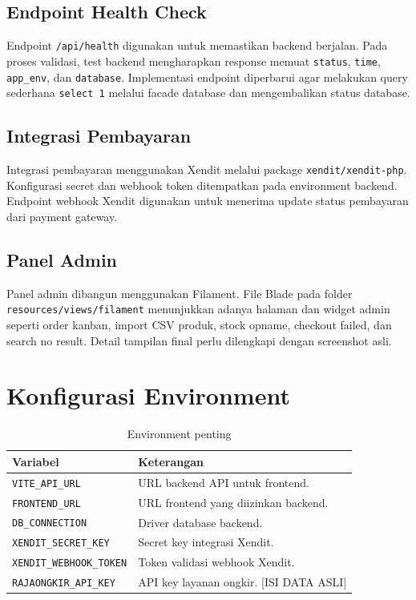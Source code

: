 \documentclass[12pt,a4paper]{report}
\begin{document}
\subsection{Endpoint Health Check}
Endpoint \texttt{/api/health} digunakan untuk memastikan backend berjalan. Pada proses validasi, test backend mengharapkan response memuat \texttt{status}, \texttt{time}, \texttt{app\_env}, dan \texttt{database}. Implementasi endpoint diperbarui agar melakukan query sederhana \texttt{select 1} melalui facade database dan mengembalikan status database.

\subsection{Integrasi Pembayaran}
Integrasi pembayaran menggunakan Xendit melalui package \texttt{xendit/xendit-php}. Konfigurasi secret dan webhook token ditempatkan pada environment backend. Endpoint webhook Xendit digunakan untuk menerima update status pembayaran dari payment gateway.

\subsection{Panel Admin}
Panel admin dibangun menggunakan Filament. File Blade pada folder \texttt{resources/views/filament} menunjukkan adanya halaman dan widget admin seperti order kanban, import CSV produk, stock opname, checkout failed, dan search no result. Detail tampilan final perlu dilengkapi dengan screenshot asli.

\section{Konfigurasi Environment}
\begin{table}[H]
\centering
\caption{Environment penting}
\begin{tabular}{p{}p{}}
\toprule
Variabel & Keterangan \\
\midrule
\texttt{VITE\_API\_URL} & URL backend API untuk frontend. \\
\texttt{FRONTEND\_URL} & URL frontend yang diizinkan backend. \\
\texttt{DB\_CONNECTION} & Driver database backend. \\
\texttt{XENDIT\_SECRET\_KEY} & Secret key integrasi Xendit. \\
\texttt{XENDIT\_WEBHOOK\_TOKEN} & Token validasi webhook Xendit. \\
\texttt{RAJAONGKIR\_API\_KEY} & API key layanan ongkir. [ISI DATA ASLI] \\
\bottomrule
\end{tabular}
\end{table}
\end{document}
